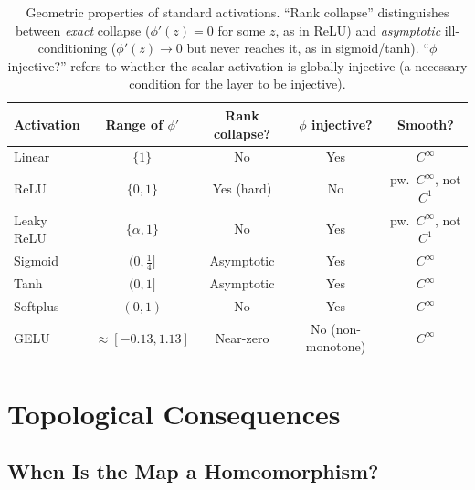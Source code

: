 \documentclass[11pt,a4paper]{article}
\theoremstyle{remark}
\begin{document}
\begin{table}[ht]
\centering
\renewcommand{\arraystretch}{1.3}
\begin{tabular}{@{} l c c c c @{}}
\toprule
\textbf{Activation} & \textbf{Range of $\phi'$} & \textbf{Rank collapse?} & \textbf{$\phi$ injective?} & \textbf{Smooth?} \\
\midrule
Linear    & $\{1\}$          & No            & Yes  & $C^\infty$ \\
ReLU      & $\{0, 1\}$       & Yes (hard)    & No               & pw.\ $C^\infty$, not $C^1$ \\
Leaky ReLU & $\{\alpha, 1\}$ & No            & Yes              & pw.\ $C^\infty$, not $C^1$ \\
Sigmoid   & $(0, \frac{1}{4}]$ & Asymptotic  & Yes              & $C^\infty$ \\
Tanh      & $(0, 1]$         & Asymptotic    & Yes              & $C^\infty$ \\
Softplus  & $(0, 1)$         & No            & Yes              & $C^\infty$ \\
GELU      & $\approx [-0.13, 1.13]$ & Near-zero & No (non-monotone) & $C^\infty$ \\
\bottomrule
\end{tabular}
\caption{Geometric properties of standard activations.  ``Rank collapse'' distinguishes between \emph{exact} collapse ($\phi'(z) = 0$ for some $z$, as in ReLU) and \emph{asymptotic} ill-conditioning ($\phi'(z) \to 0$ but never reaches it, as in sigmoid/tanh).  ``$\phi$ injective?'' refers to whether the scalar activation is globally injective (a necessary condition for the layer to be injective).}
\label{tab:activations}
\end{table}


\section{Topological Consequences}
\label{sec:topology}

\subsection{When Is the Map a Homeomorphism?}
\end{document}
